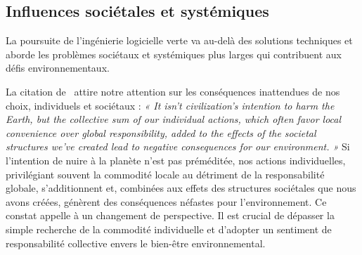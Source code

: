 
\subsection{Influences sociétales et systémiques}

La poursuite de l'ingénierie logicielle verte va au-delà des solutions techniques et aborde les problèmes sociétaux et systémiques plus larges qui contribuent aux défis environnementaux.


La citation de~\cite{SafetySecuritySustainability} attire notre attention sur les conséquences inattendues de nos choix, individuels et sociétaux : \emph{« It isn’t civilization’s intention to harm the Earth, but the collective sum of our individual actions, which often favor local convenience over global responsibility, added to the effects of the societal structures we’ve created lead to negative consequences for our environment. »} Si l'intention de nuire à la planète n'est pas préméditée, nos actions individuelles, privilégiant souvent la commodité locale au détriment de la responsabilité globale, s'additionnent et, combinées aux effets des structures sociétales que nous avons créées, génèrent des conséquences néfastes pour l'environnement. Ce constat appelle à un changement de perspective. Il est crucial de dépasser la simple recherche de la commodité individuelle et d'adopter un sentiment de responsabilité collective envers le bien-être environnemental.


